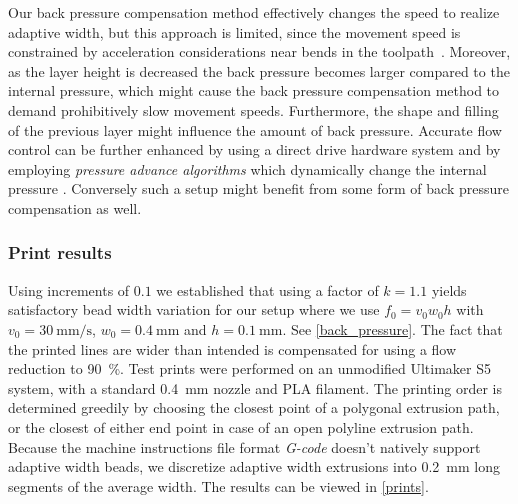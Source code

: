 \documentclass[3p,10pt,times]{elsarticle}
\theoremstyle{definition}
\numberwithin{question}{section}
\begin{document}
{{%
Our back pressure compensation method effectively changes the speed to realize adaptive width,
but this approach is limited, since the movement speed is constrained by acceleration considerations near bends in the toolpath~\cite{Ertay2018}.
Moreover, as the layer height is decreased the back pressure becomes larger compared to the internal pressure, which might cause the back pressure compensation method to demand prohibitively slow movement speeds.
Furthermore, the shape and filling of the previous layer might influence the amount of back pressure.
%
Accurate flow control can be further enhanced by using a direct drive hardware system and by employing \emph{pressure advance algorithms} which dynamically change the internal pressure \cite{tronvoll2019investigating}.
Conversely such a setup might benefit from some form of back pressure compensation as well.

\subsubsection{Print results}
Using increments of $0.1$ we established that using a factor of $k=1.1$ yields satisfactory bead width variation for our setup where we use
$f_0 = v_0 w_0 h $
with
$v_0=\SI{30}{\milli\meter\per\second}$, 
$w_0=\SI{0.4}{\milli\meter}$
and
$h=\SI{0.1}{\milli\meter}$.
See \cref{back_pressure}.
The fact that the printed lines are wider than intended is compensated for using a flow reduction to \SI{90}{\percent}.
%
Test prints were performed on an unmodified Ultimaker S5 system,
with a standard  \SI{0.4}{\milli\meter} nozzle
and PLA filament.
The printing order is determined greedily by choosing the closest point of a polygonal extrusion path, or the closest of either end point in case of an open polyline extrusion path.
Because the machine instructions file format \emph{G-code} doesn't natively support adaptive width beads,
we discretize adaptive width extrusions into \SI{0.2}{\milli\meter} long segments of the average width.
The results can be viewed in \cref{prints}.


}}
\end{document}
